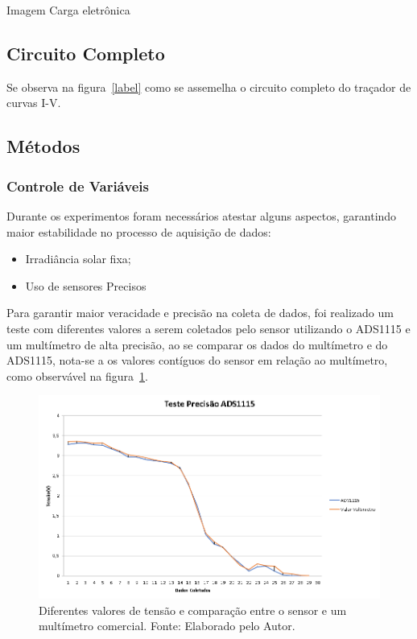 Imagem Carga eletrônica

\subsection{Circuito Completo}

Se observa na figura~\ref{label} como se assemelha o circuito completo do traçador de curvas I-V.

\subsection{Métodos}
\subsubsection{Controle de Variáveis}
Durante os experimentos foram necessários atestar alguns aspectos, garantindo maior estabilidade no processo de aquisição de dados:
\begin{itemize}
\item Irradiância solar fixa;
\item Uso de sensores Precisos
\end{itemize}

Para garantir maior veracidade e precisão na coleta de dados, foi realizado um teste com diferentes valores a serem coletados pelo sensor utilizando o ADS1115 e um multímetro de alta precisão, ao se comparar os dados do multímetro e do ADS1115, nota-se a os valores contíguos do sensor em relação ao multímetro, como observável na figura~\ref{fig:Precisao}.

\FloatBarrier
\begin{figure}[!htbp]
	\centering
	\includegraphics[scale=0.6]{imagens/Precisao}
	\caption{Diferentes valores de tensão e comparação entre o sensor e um multímetro comercial. Fonte: Elaborado pelo Autor. %
	}
	\label{fig:Precisao}
\end{figure}
\FloatBarrier

